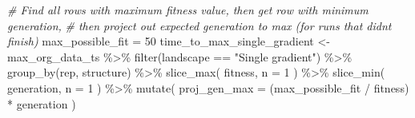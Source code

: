 \documentclass[
]{book}
\newenvironment{Shaded}{\begin{snugshade}}{\end{snugshade}}
\newcommand{\AttributeTok}[1]{\textcolor[rgb]{0.77,0.63,0.00}{#1}}
\newcommand{\CommentTok}[1]{\textcolor[rgb]{0.56,0.35,0.01}{\textit{#1}}}
\newcommand{\DecValTok}[1]{\textcolor[rgb]{0.00,0.00,0.81}{#1}}
\newcommand{\FunctionTok}[1]{\textcolor[rgb]{0.00,0.00,0.00}{#1}}
\newcommand{\NormalTok}[1]{#1}
\newcommand{\OtherTok}[1]{\textcolor[rgb]{0.56,0.35,0.01}{#1}}
\newcommand{\SpecialCharTok}[1]{\textcolor[rgb]{0.00,0.00,0.00}{#1}}
\newcommand{\StringTok}[1]{\textcolor[rgb]{0.31,0.60,0.02}{#1}}
\begin{document}
\begin{Shaded}
\begin{Highlighting}[]
\CommentTok{\# Find all rows with maximum fitness value, then get row with minimum generation,}
\CommentTok{\#  then project out expected generation to max (for runs that didn\textquotesingle{}t finish)}
\NormalTok{max\_possible\_fit }\OtherTok{=} \DecValTok{50}
\NormalTok{time\_to\_max\_single\_gradient }\OtherTok{\textless{}{-}}\NormalTok{ max\_org\_data\_ts }\SpecialCharTok{\%\textgreater{}\%}
  \FunctionTok{filter}\NormalTok{(landscape }\SpecialCharTok{==} \StringTok{"Single gradient"}\NormalTok{) }\SpecialCharTok{\%\textgreater{}\%}
  \FunctionTok{group\_by}\NormalTok{(rep, structure) }\SpecialCharTok{\%\textgreater{}\%}
  \FunctionTok{slice\_max}\NormalTok{(}
\NormalTok{    fitness,}
    \AttributeTok{n =} \DecValTok{1}
\NormalTok{  ) }\SpecialCharTok{\%\textgreater{}\%}
  \FunctionTok{slice\_min}\NormalTok{(}
\NormalTok{    generation,}
    \AttributeTok{n =} \DecValTok{1}
\NormalTok{  ) }\SpecialCharTok{\%\textgreater{}\%}
  \FunctionTok{mutate}\NormalTok{(}
    \AttributeTok{proj\_gen\_max =}\NormalTok{ (max\_possible\_fit }\SpecialCharTok{/}\NormalTok{ fitness) }\SpecialCharTok{*}\NormalTok{ generation}
\NormalTok{  )}
\end{Highlighting}
\end{Shaded}
\end{document}
